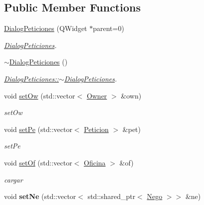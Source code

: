 \subsection*{Public Member Functions}
\begin{DoxyCompactItemize}
\item 
\hyperlink{classDialogPeticiones_aa21bc875975e468ceab548f6fa23e4c5}{Dialog\+Peticiones} (Q\+Widget $\ast$parent=0)
\begin{DoxyCompactList}\small\item\em \hyperlink{classDialogPeticiones}{Dialog\+Peticiones}. \end{DoxyCompactList}\item 
\hypertarget{classDialogPeticiones_ae8b45e18bccff1ec86e525b817bba912}{}\hyperlink{classDialogPeticiones_ae8b45e18bccff1ec86e525b817bba912}{$\sim$\+Dialog\+Peticiones} ()\label{classDialogPeticiones_ae8b45e18bccff1ec86e525b817bba912}

\begin{DoxyCompactList}\small\item\em \hyperlink{classDialogPeticiones_ae8b45e18bccff1ec86e525b817bba912}{Dialog\+Peticiones\+::$\sim$\+Dialog\+Peticiones}. \end{DoxyCompactList}\item 
void \hyperlink{classDialogPeticiones_a7084e851f919b8fdb9e91110cda77c7f}{set\+Ow} (std\+::vector$<$ \hyperlink{classOwner}{Owner} $>$ \&own)
\begin{DoxyCompactList}\small\item\em set\+Ow \end{DoxyCompactList}\item 
void \hyperlink{classDialogPeticiones_a5c7ea55482f49534c0ee5ed671253f24}{set\+Pe} (std\+::vector$<$ \hyperlink{classPeticion}{Peticion} $>$ \&pet)
\begin{DoxyCompactList}\small\item\em set\+Pe \end{DoxyCompactList}\item 
\hypertarget{classDialogPeticiones_a537bb011119f744329fd347588c5ce02}{}void \hyperlink{classDialogPeticiones_a537bb011119f744329fd347588c5ce02}{set\+Of} (std\+::vector$<$ \hyperlink{classOficina}{Oficina} $>$ \&of)\label{classDialogPeticiones_a537bb011119f744329fd347588c5ce02}

\begin{DoxyCompactList}\small\item\em cargar \end{DoxyCompactList}\item 
\hypertarget{classDialogPeticiones_abe4b4d742a1b4bb462827de496d7b5fe}{}void {\bfseries set\+Ne} (std\+::vector$<$ std\+::shared\+\_\+ptr$<$ \hyperlink{classNego}{Nego} $>$$>$ \&ne)\label{classDialogPeticiones_abe4b4d742a1b4bb462827de496d7b5fe}


\end{DoxyCompactItemize}
